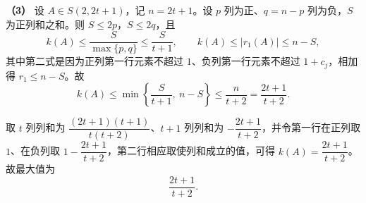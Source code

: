 \begin{answer}
\textbf{（3）} 设 $A\in S(2,2t+1)$，记 $n=2t+1$。设 $p$ 列为正、$q=n-p$ 列为负，$S$ 为正列和之和。则 $S\leqslant2p$，$S\leqslant2q$，且
\nopagebreak[4]
\[k(A)\leqslant\frac S{\max\{p,q\}}\leqslant\frac S{t+1},\qquad k(A)\leqslant|r_1(A)|\leqslant n-S,\]
其中第二式是因为正列第一行元素不超过 $1$、负列第一行元素不超过 $1+c_j$，相加得 $r_1\leqslant n-S$。故
\nopagebreak[4]
\[k(A)\leqslant\min\left\{\frac S{t+1},\ n-S\right\}\leqslant\frac n{t+2}=\frac{2t+1}{t+2}.\]

取 $t$ 列列和为 $\dfrac{(2t+1)(t+1)}{t(t+2)}$、$t+1$ 列列和为 $-\dfrac{2t+1}{t+2}$，并令第一行在正列取 $1$、在负列取 $1-\dfrac{2t+1}{t+2}$，第二行相应取使列和成立的值，可得 $k(A)=\dfrac{2t+1}{t+2}$。故最大值为
\nopagebreak[4]
\[\frac{2t+1}{t+2}.\]




\end{answer}